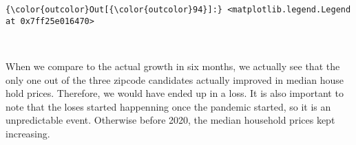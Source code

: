 \documentclass[11pt]{article}
\begin{document}
\begin{Verbatim}[commandchars=\\\{\}]
{\color{outcolor}Out[{\color{outcolor}94}]:} <matplotlib.legend.Legend at 0x7ff25e016470>
\end{Verbatim}
            
    \begin{center}
    \end{center}
    { \hspace*{\fill} \\}
    
    When we compare to the actual growth in six months, we actually see that
the only one out of the three zipcode candidates actually improved in
median house hold prices. Therefore, we would have ended up in a loss.
It is also important to note that the loses started happenning once the
pandemic started, so it is an unpredictable event. Otherwise before
2020, the median household prices kept increasing.


    
    
    
    
\end{document}
